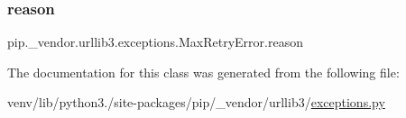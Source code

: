 \subsubsection{\texorpdfstring{reason}{reason}}
{\footnotesize\ttfamily pip.\+\_\+vendor.\+urllib3.\+exceptions.\+Max\+Retry\+Error.\+reason}



The documentation for this class was generated from the following file\+:\begin{DoxyCompactItemize}
\item 
venv/lib/python3./site-\/packages/pip/\+\_\+vendor/urllib3/\hyperlink{pip_2__vendor_2urllib3_2exceptions_8py}{exceptions.\+py}\end{DoxyCompactItemize}
